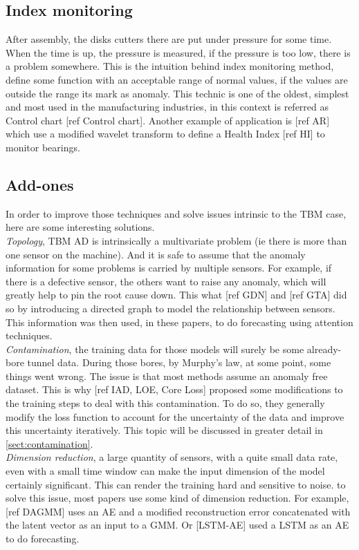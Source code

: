 \documentclass[../../main/main.tex]{subfiles}
\begin{document}
    \subsection{Index monitoring}
        After assembly, the disks cutters there are put under pressure for some time. When the time is up, the 
        pressure is measured, if the pressure is too low, there is a problem somewhere. This is the intuition behind index 
        monitoring method, define some function with an acceptable range of normal values, if the values are outside the range 
        its mark as anomaly. This technic is one of the oldest, simplest and most used in the manufacturing industries, in
        this context is referred as Control chart [ref Control chart]. Another example of application is [ref AR] which 
        use a modified wavelet transform to define a Health Index [ref HI] to monitor bearings. 
    
    \subsection{Add-ones}
        In order to improve those techniques and solve issues intrinsic to the TBM case, here are some interesting solutions.\\
        \textit{Topology}, TBM AD is intrinsically a multivariate problem (ie there is more than one sensor on the machine).
        And it is safe to assume that the anomaly information for some problems is carried by multiple sensors. For example, if there 
        is a defective sensor, the others want to raise any anomaly, which will greatly help to pin the root cause down. This what 
        [ref GDN] and [ref GTA] did so by introducing a directed graph to model the relationship between sensors. This information 
        was then used, in these papers, to do forecasting using attention techniques.\\
        
        \textit{Contamination}, the training data for those models will surely be some already-bore tunnel data. 
        During those bores, by Murphy's law, at some point, some things went wrong. The issue is that most methods assume an anomaly
        free dataset. This is why [ref IAD, LOE, Core Loss] proposed some modifications to the training steps to deal with this 
        contamination. To do so, they generally modify the loss function to account for the uncertainty of the data and improve 
        this uncertainty iteratively. This topic will be discussed in greater detail in \ref{sect:contamination}.\\
    
        \textit{Dimension reduction}, a large quantity of sensors, with a quite small data rate, even with a small time window
        can make the input dimension of the model certainly significant. This can render the training hard and sensitive to noise. 
        to solve this issue, most papers use some kind of dimension reduction. For example, [ref DAGMM] uses an AE and 
        a modified reconstruction error concatenated with the latent vector as an input to a GMM. Or [LSTM-AE] used a LSTM as
        an AE to do forecasting.

        
    
\end{document}
